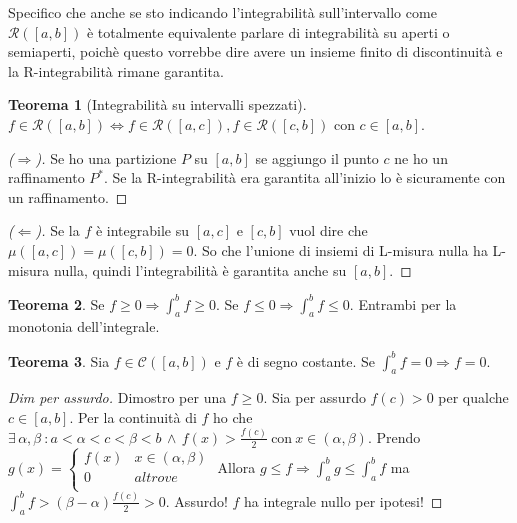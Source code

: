 \documentclass{article}
\theoremstyle{definition}
\newtheorem{theorem}{Teorema}[section]
\theoremstyle{definition}
\theoremstyle{definition}
\theoremstyle{definition}
\theoremstyle{definition}
\theoremstyle{definition}
\begin{document}
Specifico che anche se sto indicando l'integrabilità sull'intervallo come $\mathcal{R}([a,b])$ è totalmente equivalente parlare di integrabilità su aperti o semiaperti, poichè questo vorrebbe dire avere un insieme finito di discontinuità e la R-integrabilità rimane garantita.

\begin{theorem}[Integrabilità su intervalli spezzati]
    $f\in\mathcal{R}([a,b]) \Leftrightarrow f\in\mathcal{R}([a,c]), f\in\mathcal{R}([c,b])$ con $c\in[a,b]$.
    \begin{proof}[($\Rightarrow$)]
        Se ho una partizione $P$ su $[a,b]$ se aggiungo il punto $c$ ne ho un raffinamento $P^*$. Se la R-integrabilità era garantita all'inizio lo è sicuramente con un raffinamento.
    \end{proof}
    \begin{proof}[($\Leftarrow$)]
        Se la $f$ è integrabile su $[a,c]$ e $[c,b]$ vuol dire che $\mu([a,c])=\mu([c,b])=0$. So che l'unione di insiemi di L-misura nulla ha L-misura nulla, quindi l'integrabilità è garantita anche su $[a,b]$.
    \end{proof}
\end{theorem}

\begin{theorem}
    Se $f\geq 0 \Rightarrow \int_{a}^{b}f \geq 0$. \; Se $f\leq 0 \Rightarrow \int_{a}^{b}f \leq 0$. Entrambi per la monotonia dell'integrale.
\end{theorem}

\begin{theorem}
    Sia $f\in\mathcal{C}([a,b])$ e $f$ è di segno costante. Se $\int_{a}^{b}f=0 \Rightarrow f=0$.
    \begin{proof}[Dim per assurdo]
        Dimostro per una $f\geq 0$. Sia per assurdo $f(c)>0$ per qualche $c\in[a,b]$. Per la continuità di $f$ ho che $\exists \, \alpha,\beta \: : a<\alpha<c<\beta<b \,\wedge\, f(x) > \frac{f(c)}{2} \:\text{con}\: x\in(\alpha,\beta)$.
        Prendo $g(x)= \begin{cases}
            f(x) & x\in(\alpha,\beta) \\
            0 & altrove \\
        \end{cases}$
        Allora $g \leq f \Rightarrow \int_a^b g \leq \int_a^b f$ ma $\int_a^b f > (\beta-\alpha)\frac{f(c)}{2}>0$. Assurdo! $f$ ha integrale nullo per ipotesi!
    \end{proof}
\end{theorem}
\end{document}
